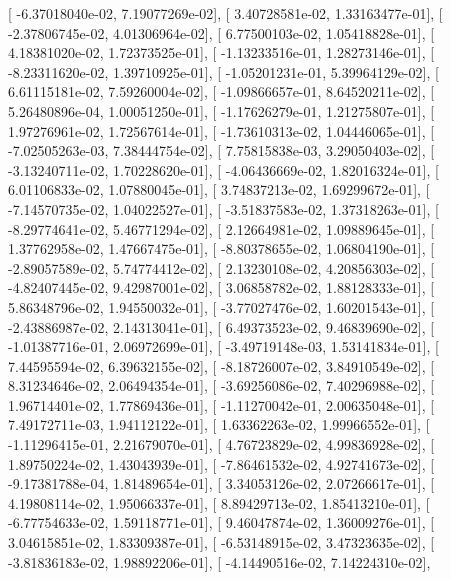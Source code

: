 \documentclass{article}
\begin{document}
       [ -6.37018040e-02,   7.19077269e-02],
       [  3.40728581e-02,   1.33163477e-01],
       [ -2.37806745e-02,   4.01306964e-02],
       [  6.77500103e-02,   1.05418828e-01],
       [  4.18381020e-02,   1.72373525e-01],
       [ -1.13233516e-01,   1.28273146e-01],
       [ -8.23311620e-02,   1.39710925e-01],
       [ -1.05201231e-01,   5.39964129e-02],
       [  6.61115181e-02,   7.59260004e-02],
       [ -1.09866657e-01,   8.64520211e-02],
       [  5.26480896e-04,   1.00051250e-01],
       [ -1.17626279e-01,   1.21275807e-01],
       [  1.97276961e-02,   1.72567614e-01],
       [ -1.73610313e-02,   1.04446065e-01],
       [ -7.02505263e-03,   7.38444754e-02],
       [  7.75815838e-03,   3.29050403e-02],
       [ -3.13240711e-02,   1.70228620e-01],
       [ -4.06436669e-02,   1.82016324e-01],
       [  6.01106833e-02,   1.07880045e-01],
       [  3.74837213e-02,   1.69299672e-01],
       [ -7.14570735e-02,   1.04022527e-01],
       [ -3.51837583e-02,   1.37318263e-01],
       [ -8.29774641e-02,   5.46771294e-02],
       [  2.12664981e-02,   1.09889645e-01],
       [  1.37762958e-02,   1.47667475e-01],
       [ -8.80378655e-02,   1.06804190e-01],
       [ -2.89057589e-02,   5.74774412e-02],
       [  2.13230108e-02,   4.20856303e-02],
       [ -4.82407445e-02,   9.42987001e-02],
       [  3.06858782e-02,   1.88128333e-01],
       [  5.86348796e-02,   1.94550032e-01],
       [ -3.77027476e-02,   1.60201543e-01],
       [ -2.43886987e-02,   2.14313041e-01],
       [  6.49373523e-02,   9.46839690e-02],
       [ -1.01387716e-01,   2.06972699e-01],
       [ -3.49719148e-03,   1.53141834e-01],
       [  7.44595594e-02,   6.39632155e-02],
       [ -8.18726007e-02,   3.84910549e-02],
       [  8.31234646e-02,   2.06494354e-01],
       [ -3.69256086e-02,   7.40296988e-02],
       [  1.96714401e-02,   1.77869436e-01],
       [ -1.11270042e-01,   2.00635048e-01],
       [  7.49172711e-03,   1.94112122e-01],
       [  1.63362263e-02,   1.99966552e-01],
       [ -1.11296415e-01,   2.21679070e-01],
       [  4.76723829e-02,   4.99836928e-02],
       [  1.89750224e-02,   1.43043939e-01],
       [ -7.86461532e-02,   4.92741673e-02],
       [ -9.17381788e-04,   1.81489654e-01],
       [  3.34053126e-02,   2.07266617e-01],
       [  4.19808114e-02,   1.95066337e-01],
       [  8.89429713e-02,   1.85413210e-01],
       [ -6.77754633e-02,   1.59118771e-01],
       [  9.46047874e-02,   1.36009276e-01],
       [  3.04615851e-02,   1.83309387e-01],
       [ -6.53148915e-02,   3.47323635e-02],
       [ -3.81836183e-02,   1.98892206e-01],
       [ -4.14490516e-02,   7.14224310e-02],
\end{document}
